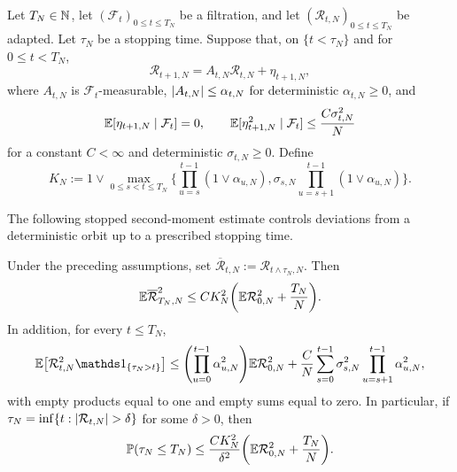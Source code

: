 \documentclass[11pt,reqno,a4paper]{article}
\newcommand{\Pp}{\P}
\newcommand{\Ee}{\E}
\begin{document}
Let $T_N\in\mathbb{N}$, let $(\mathcal F_t)_{0\leq t\leq T_N}$ be a filtration,
and let $(\mathcal R_{t,N})_{0\leq t\leq T_N}$ be adapted. Let $\tau_N$ be a
stopping time. Suppose that, on $\{t<\tau_N\}$ and for $0\leq t<T_N$,
\begin{equation}\label{eq:common-tracking-recursion}
  \mathcal R_{t+1,N}
  =
  A_{t,N}\mathcal R_{t,N}+\eta_{t+1,N},
\end{equation}
where $A_{t,N}$ is $\mathcal F_t$-measurable,
$\abs{A_{t,N}}\leq\alpha_{t,N}$ for deterministic $\alpha_{t,N}\geq0$, and
\begin{equation}\label{eq:common-tracking-noise}
  \Ee[\eta_{t+1,N}\mid\mathcal F_t]=0,
  \qquad
  \Ee[\eta_{t+1,N}^2\mid\mathcal F_t]
  \leq
  \frac{C\sigma_{t,N}^2}{N}
\end{equation}
for a constant $C<\infty$ and deterministic $\sigma_{t,N}\geq0$. Define
\begin{equation}\label{eq:common-tracking-amplification}
  K_N:=1\vee\max_{0\leq s<t\leq T_N}
  \bigg\{
  \prod_{u=s}^{t-1}(1\vee\alpha_{u,N}),
  \sigma_{s,N}
  \prod_{u=s+1}^{t-1}(1\vee\alpha_{u,N})
  \bigg\}.
\end{equation}

The following stopped second-moment estimate controls deviations from a
deterministic orbit up to a prescribed stopping time.
\begin{lemma}
\label{lem:common-stopped-orbit-tracking}
  Under the preceding assumptions, set
  $\overline{\mathcal R}_{t,N}:=\mathcal R_{t\wedge\tau_N,N}$. Then
  \begin{equation}\label{eq:common-stopped-orbit-tracking}
    \Ee\overline{\mathcal R}_{T_N,N}^2
    \leq
    CK_N^2\left(
      \Ee\mathcal R_{0,N}^2+\frac{T_N}{N}
    \right).
  \end{equation}
  In addition, for every $t\leq T_N$,
  \begin{equation}\label{eq:common-killed-orbit-tracking}
    \Ee\left[
      \mathcal R_{t,N}^2\one_{\{\tau_N>t\}}
    \right]
    \leq{}
    \left(\prod_{u=0}^{t-1}\alpha_{u,N}^2\right)
      \Ee\mathcal R_{0,N}^2
    +\frac{C}{N}\sum_{s=0}^{t-1}
      \sigma_{s,N}^2
      \prod_{u=s+1}^{t-1}\alpha_{u,N}^2,
  \end{equation}
  with empty products equal to one and empty sums equal to zero.
  In particular, if
  $\tau_N=\inf\{t:\abs{\mathcal R_{t,N}}>\delta\}$ for some $\delta>0$,
  then
  \begin{equation}\label{eq:common-orbit-exit-bound}
    \Pp(\tau_N\leq T_N)
    \leq
    \frac{CK_N^2}{\delta^2}
    \left(
      \Ee\mathcal R_{0,N}^2+\frac{T_N}{N}
    \right).
  \end{equation}
\end{lemma}
\end{document}

